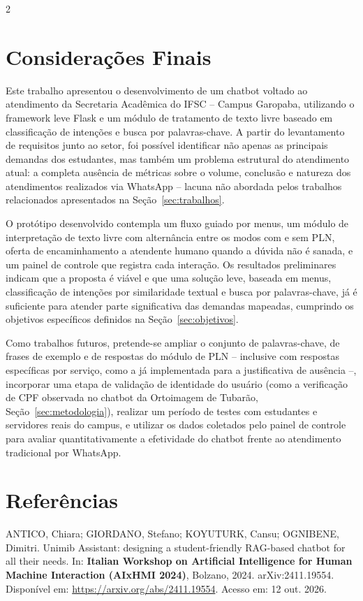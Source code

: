 \documentclass[10pt]{article}
\begin{document}
\begin{multicols}{2}
\section{Considerações Finais}

Este trabalho apresentou o desenvolvimento de um chatbot voltado ao
atendimento da Secretaria Acadêmica do IFSC -- Campus Garopaba,
utilizando o framework leve Flask e um módulo de tratamento de texto livre baseado em classificação de intenções e busca por palavras-chave. A partir do levantamento de
requisitos junto ao setor, foi possível identificar não apenas as
principais demandas dos estudantes, mas também um problema estrutural do
atendimento atual: a completa ausência de métricas sobre o volume,
conclusão e natureza dos atendimentos realizados via WhatsApp -- lacuna
não abordada pelos trabalhos relacionados apresentados na Seção~\ref{sec:trabalhos}.

O protótipo desenvolvido contempla um fluxo guiado por menus, um módulo
de interpretação de texto livre com alternância entre os modos com e sem
PLN, oferta de encaminhamento a atendente humano quando a dúvida não é sanada, e um
painel de controle que registra cada interação. Os resultados
preliminares indicam que a proposta é viável e que uma solução leve,
baseada em menus, classificação de intenções por similaridade textual e busca por palavras-chave, já é suficiente para
atender parte significativa das demandas mapeadas, cumprindo os
objetivos específicos definidos na Seção~\ref{sec:objetivos}.

Como trabalhos futuros, pretende-se ampliar o conjunto de palavras-chave, de frases de exemplo e de respostas do módulo de PLN -- inclusive com respostas específicas por serviço, como a já implementada para a justificativa de ausência --, incorporar uma etapa de validação de
identidade do usuário (como a verificação de CPF observada no chatbot da
Ortoimagem de Tubarão, Seção~\ref{sec:metodologia}), realizar um período de testes com
estudantes e servidores reais do campus, e utilizar os dados coletados
pelo painel de controle para avaliar quantitativamente a efetividade do
chatbot frente ao atendimento tradicional por WhatsApp.

\section{Referências}

ANTICO, Chiara; GIORDANO, Stefano; KOYUTURK, Cansu; OGNIBENE, Dimitri.
Unimib Assistant: designing a student-friendly RAG-based chatbot for all
their needs. In: \textbf{Italian Workshop on Artificial Intelligence for
Human Machine Interaction (AIxHMI 2024)}, Bolzano, 2024. arXiv:2411.19554.
Disponível em: \url{https://arxiv.org/abs/2411.19554}. Acesso em: 12 out.
2026.


\end{multicols}
\end{document}
